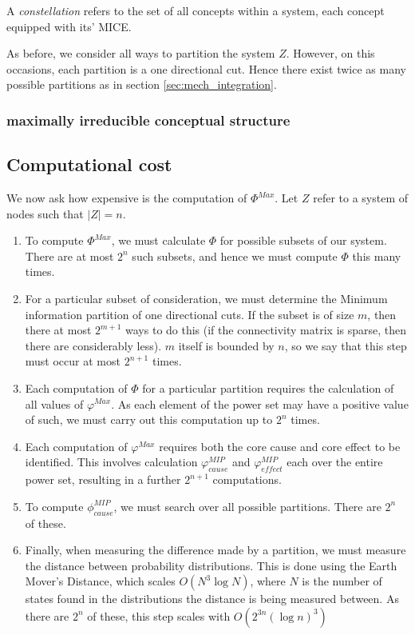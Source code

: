 \begin{definition}
	{A \textit{constellation} refers to the set of all concepts within a system, each concept equipped with its' MICE.}
\end{definition}

As before, we consider all ways to partition the system $Z$. However, on this occasions, each partition is a one directional cut. Hence there exist twice as many possible partitions as in section \ref{sec:mech_integration}.


\subsubsection{maximally irreducible conceptual structure}


\subsection{Computational cost}
We now ask how expensive is the computation of $\Phi^{Max}$. Let $Z$ refer to a system of nodes such that $|Z| = n$.

\begin{enumerate}
	\item To compute $\Phi^{Max}$, we must calculate $\Phi$ for possible subsets of our system. There are at most $2^n$ such subsets, and hence we must compute $\Phi$ this many times.
	\item For a particular subset of consideration, we must determine the Minimum information partition of one directional cuts. If the subset is of size $m$, then there at most $2^{m+1}$ ways to do this (if the connectivity matrix is sparse, then there are considerably less). $m$ itself is bounded by $n$, so we say that this step must occur at most $2^{n+1}$ times.
	\item Each computation of $\Phi$ for a particular partition requires the calculation of all values of $\varphi^{Max}$. As each element of the power set may have a positive value of such, we must carry out this computation up to $2^n$ times.
	\item Each computation of $\varphi^{Max}$ requires both the core cause and core effect to be identified. This involves calculation $\varphi^{MIP}_{cause}$ and $\varphi^{MIP}_{effect}$ each over the entire power set, resulting in a further $2^{n+1}$ computations.  
	\item To compute $\phi_{cause}^{MIP}$, we must search over all possible partitions. There are $2^n$ of these.
	\item Finally, when measuring the difference made by a partition, we must measure the distance between probability distributions. This is done using the Earth Mover's Distance, which scales $O(N^3 \log N)$, where $N$ is the number of states found in the distributions the distance is being measured between. As there are $2^n$ of these, this step scales with $O(2^{3n} (\log n)^3)$
\end{enumerate}

